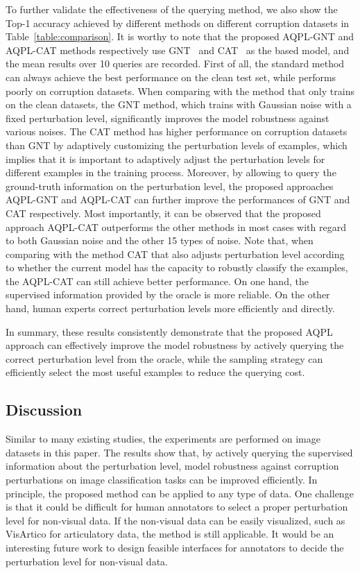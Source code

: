 \documentclass[letterpaper]{article} %
\begin{document}
To further validate the effectiveness of the querying method, we also show the Top-1 accuracy achieved by different methods on different corruption datasets in Table~\ref{table:comparison}. It is worthy to note that the proposed AQPL-GNT and AQPL-CAT methods respectively use GNT~\cite{rusak2020increasing} and CAT~\cite{cheng2020cat} as the based model, and the mean results over 10 queries are recorded. First of all, the standard method can always achieve the best performance on the clean test set, while performs poorly on corruption datasets. When comparing with the method that only trains on the clean datasets, the GNT method, which trains with Gaussian noise with a fixed perturbation level, significantly improves the model robustness against various noises. The CAT method has higher performance on corruption datasets than GNT by adaptively customizing the perturbation levels of examples, which implies that it is important to adaptively adjust the perturbation levels for different examples in the training process. Moreover, by allowing to query the ground-truth information on the perturbation level, the proposed approaches AQPL-GNT and AQPL-CAT can further improve the performances of GNT and CAT respectively. Most importantly, it can be observed that the proposed approach AQPL-CAT outperforms the other methods in most cases with regard to both Gaussian noise and the other 15 types of noise. Note that, when comparing with the method CAT that also adjusts perturbation level according to whether the current model has the capacity to robustly classify the examples, the AQPL-CAT can still achieve better performance. On one hand, the supervised information provided by the oracle is more reliable. On the other hand, human experts correct perturbation levels more efficiently and directly.

In summary, these results consistently demonstrate that the proposed AQPL approach can effectively improve the model robustness by actively querying the correct perturbation level from the oracle, while the sampling strategy can efficiently select the most useful examples to reduce the querying cost.


\subsection{Discussion}

Similar to many existing studies, the experiments are performed on image datasets in this paper. The results show that, by actively querying the supervised information about the perturbation level, model robustness against corruption perturbations on image classification tasks can be improved efficiently. In principle, the proposed method can be applied to any type of data. One challenge is that it could be difficult for human annotators to select a proper perturbation level for non-visual data. If the non-visual data can be easily visualized, such as VisArtico \cite{ouni2012visartico} for articulatory data, the method is still applicable. It would be an interesting future work to design feasible interfaces for annotators to decide the perturbation level for non-visual data.
\end{document}
